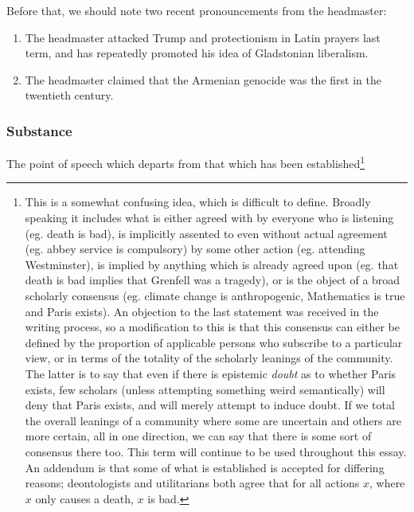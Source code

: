 \documentclass[12pt,a4paper]{report}
\begin{document}
\begin{multicols}{2}
\begin{multicols}{2}
Before that, we should note two recent pronouncements from the headmaster:
\begin{enumerate}
	\item The headmaster attacked Trump and protectionism in Latin prayers last term, and has repeatedly promoted his idea of Gladstonian liberalism.
	\item The headmaster claimed that the Armenian genocide was the first in the twentieth century.
\end{enumerate}

\subsubsection{Substance}\label{substance}

The point of speech which departs from that which has been
established\footnote{This is a somewhat confusing idea, which is
	difficult to define. Broadly speaking it includes what is either
	agreed with by everyone who is listening (eg. death is bad), is
	implicitly assented to even without actual agreement (eg. abbey
	service is compulsory) by some other action (eg. attending
	Westminster), is implied by anything which is already agreed upon (eg.
	that death is bad implies that Grenfell was a tragedy), or is the
	object of a broad scholarly consensus (eg. climate change is
	anthropogenic, Mathematics is true and Paris exists). An objection to
	the last statement was received in the writing process, so a
	modification to this is that this consensus can either be defined by
	the proportion of applicable persons who subscribe to a particular
	view, or in terms of the totality of the scholarly leanings of the
	community. The latter is to say that even if there is epistemic
	\textit{doubt} as to whether Paris exists, few scholars (unless
	attempting something weird semantically) will deny that Paris exists,
	and will merely attempt to induce doubt. If we total the overall
	leanings of a community where some are uncertain and others are more
	certain, all in one direction, we can say that there is some sort of
	consensus there too. This term will continue to be used throughout
	this essay. An addendum is that some of what is established is
	accepted for differing reasons; deontologists and utilitarians both
	agree that for all actions $x$, where $x$ only causes a
	death, $x$ is bad.
	
}
\end{multicols}
\end{multicols}
\end{document}
